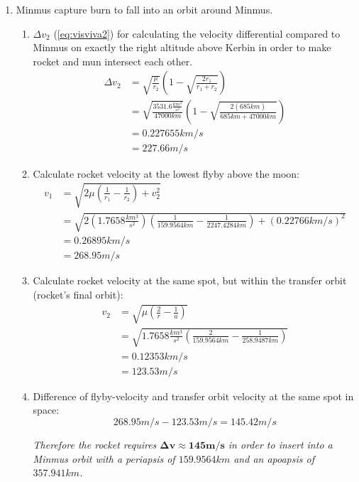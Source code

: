 \documentclass[12pt,paper=A4,numbers=noenddot,bibliography=totoc,listof=totoc,DIV=11,BCOR=1mm]{scrreprt}
\begin{document}
\begin{enumerate}
\item Minmus capture burn to fall into an orbit around Minmus.\\
	\begin{enumerate}
	\item $\Delta v_{2}$ (\ref{eq:visviva2}) for calculating the velocity differential compared to Minmus on exactly the right altitude above Kerbin in order to make rocket and mun intersect each other.
	\begin{equation*}
	\begin{split}
	\Delta v_{2} &= \sqrt{\frac{\mu}{r_{2}}} \left( 1-\sqrt{\frac{2r_{1}}{r_{1}+r_{2}}} \right) \\
	             &= \sqrt{\frac{3531.6 \frac{km^{3}}{s^{2}}}{47000km}} \left( 1-\sqrt{\frac{2(685km)}{685km+47000km}} \right) \\
	             &= 0.227655 km/s \\
	             &= 227.66 m/s
	\end{split}
	\end{equation*}
	\item Calculate rocket velocity at the lowest flyby above the moon:
	\begin{equation}
	\begin{split}
	v_{1} &= \sqrt{2\mu \left( \frac{1}{r_{1}} - \frac{1}{r_{2}} \right) + v_{2}^{2} }\\
	      &= \sqrt{2(1.7658 \frac{km^{3}}{s^{2}}) \left( \frac{1}{159.9564km} - \frac{1}{2247.4284km} \right) + (0.22766km/s)^{2} }\\
	      &= 0.26895 km/s \\
	      &= 268.95 m/s
	\end{split}
	\end{equation}
	\item Calculate rocket velocity at the same spot, but within the transfer orbit (rocket's final orbit):
	\begin{equation*}
	\begin{split}
	v_{2} &= \sqrt{\mu \left( \frac{2}{r} - \frac{1}{a} \right) } \\
	      &= \sqrt{1.7658 \frac{km^{3}}{s^{2}} \left( \frac{2}{159.9564km} - \frac{1}{258.9487km} \right) } \\
	      &= 0.12353 km/s \\
	      &= 123.53 m/s
	\end{split}
	\end{equation*}
	\item Difference of flyby-velocity and transfer orbit velocity at the same spot in space:
	$$
	268.95 m/s - 123.53 m/s = 145.42 m/s
	$$
	
	\emph{Therefore the rocket requires $\mathbf{\Delta v \approx 145 m/s}$ in order to insert into a Minmus orbit with a periapsis of $159.9564km$ and an apoapsis of $357.941km$.}
	\end{enumerate}


\end{enumerate}
\bigskip
\end{document}
